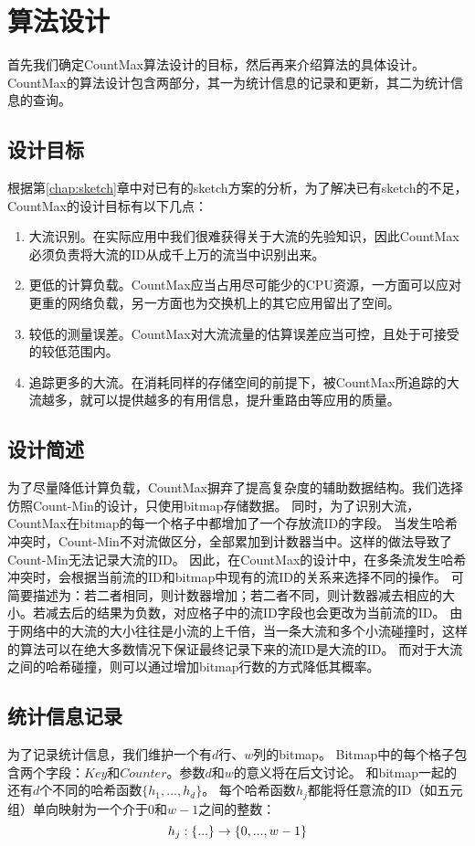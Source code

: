 

\section{算法设计}
首先我们确定CountMax算法设计的目标，然后再来介绍算法的具体设计。
CountMax的算法设计包含两部分，其一为统计信息的记录和更新，其二为统计信息的查询。

\subsection{设计目标}
根据第\ref{chap:sketch}章中对已有的sketch方案的分析，为了解决已有sketch的不足，CountMax的设计目标有以下几点：
\begin{enumerate}
	\item 大流识别。在实际应用中我们很难获得关于大流的先验知识，因此CountMax必须负责将大流的ID从成千上万的流当中识别出来。
	\item 更低的计算负载。CountMax应当占用尽可能少的CPU资源，一方面可以应对更重的网络负载，另一方面也为交换机上的其它应用留出了空间。
	\item 较低的测量误差。CountMax对大流流量的估算误差应当可控，且处于可接受的较低范围内。
	\item 追踪更多的大流。在消耗同样的存储空间的前提下，被CountMax所追踪的大流越多，就可以提供越多的有用信息，提升重路由等应用的质量。
\end{enumerate}

\subsection{设计简述}
为了尽量降低计算负载，CountMax摒弃了提高复杂度的辅助数据结构。我们选择仿照Count-Min的设计，只使用bitmap存储数据。
同时，为了识别大流，CountMax在bitmap的每一个格子中都增加了一个存放流ID的字段。
当发生哈希冲突时，Count-Min不对流做区分，全部累加到计数器当中。这样的做法导致了Count-Min无法记录大流的ID。
因此，在CountMax的设计中，在多条流发生哈希冲突时，会根据当前流的ID和bitmap中现有的流ID的关系来选择不同的操作。
可简要描述为：若二者相同，则计数器增加；若二者不同，则计数器减去相应的大小。若减去后的结果为负数，对应格子中的流ID字段也会更改为当前流的ID。
由于网络中的大流的大小往往是小流的上千倍，当一条大流和多个小流碰撞时，这样的算法可以在绝大多数情况下保证最终记录下来的流ID是大流的ID。
而对于大流之间的哈希碰撞，则可以通过增加bitmap行数的方式降低其概率。

\subsection{统计信息记录}
为了记录统计信息，我们维护一个有$d$行、$w$列的bitmap。
Bitmap中的每个格子包含两个字段：$Key$和$Counter$。参数$d$和$w$的意义将在后文讨论。
和bitmap一起的还有$d$个不同的哈希函数$\{h_{1},...,h_{d}\}$。
每个哈希函数$h_j$都能将任意流的ID（如五元组）单向映射为一个介于$0$和$w-1$之间的整数：
\begin{equation}
\notag h_j: \{...\} \to \{0, ..., w-1\}
\end{equation}

